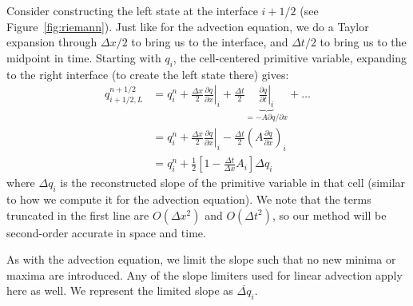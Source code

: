 Consider constructing the left state at the interface $i+1/2$ (see
Figure~\ref{fig:riemann}).  Just like for the advection equation, we
do a Taylor expansion through $\Delta x/2$ to bring us to the
interface, and $\Delta t/2$ to bring us to the midpoint in time.
Starting with $q_i$, the cell-centered primitive variable, expanding
to the right interface (to create the left state there) gives:
\begin{align}
q_{i+1/2,L}^{n+1/2} &= q_i^n + 
    \left . \frac{\Delta x}{2} \frac{\partial q}{\partial x} \right |_i +
    \frac{\Delta t}{2} \underbrace{\left .\frac{\partial q}{\partial t} \right |_i}_{= -A \partial q / \partial x} + \ldots \\
&= q_i^n + \frac{\Delta x}{2} \left . \frac{\partial q}{\partial x} \right |_i
          - \frac{\Delta t}{2} \left ( A \frac{\partial q}{\partial x} \right )_i\\
&= q_i^n + \frac{1}{2} \left [ 1 - \frac{\Delta t}{\Delta x} A_i \right ] \Delta q_i \label{eq:taylorstate}
\end{align}
where $\Delta q_i$ is the reconstructed slope of the primitive
variable in that cell (similar to how we compute it for the advection
equation).  We note that the terms truncated in the first line are
$O(\Delta x^2)$ and $O(\Delta t^2)$, so our method will be second-order
accurate in space and time.

As with the advection equation, we limit the slope such that no new minima
or maxima are introduced.  Any of the slope limiters used for linear advection
apply here as well.  We represent the limited slope as $\overline{\Delta q}_i$.

